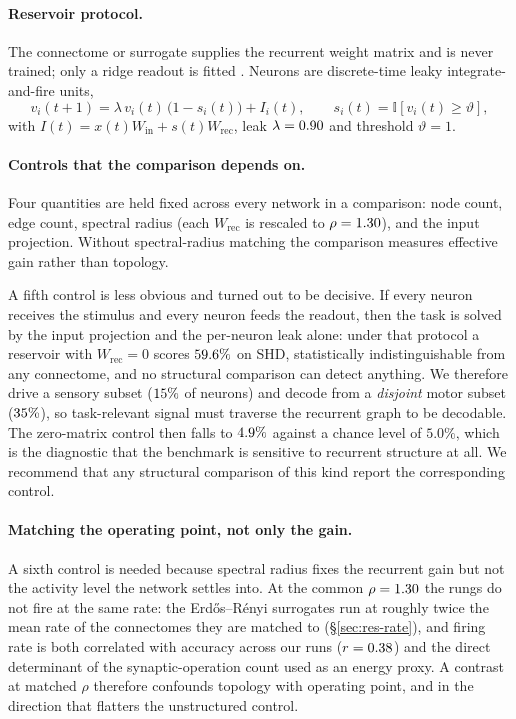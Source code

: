 \paragraph{Reservoir protocol.}
The connectome or surrogate supplies the recurrent weight matrix and is never
trained; only a ridge readout is fitted \cite{lukosevicius2009reservoir,
suarez2024connectome}. Neurons are discrete-time leaky integrate-and-fire units,
\begin{equation}
v_i(t{+}1) = \lambda\, v_i(t)\,\big(1 - s_i(t)\big) + I_i(t),
\qquad
s_i(t) = \mathbb{I}\!\left[v_i(t) \ge \vartheta\right],
\end{equation}
with $I(t) = x(t) W_{\mathrm{in}} + s(t) W_{\mathrm{rec}}$, leak $\lambda =
0.90$ and threshold $\vartheta = 1$.

\paragraph{Controls that the comparison depends on.}
Four quantities are held fixed across every network in a comparison: node count, edge
count, spectral radius (each $W_{\mathrm{rec}}$ is rescaled to $\rho =
1.30$), and the input projection. Without spectral-radius matching the
comparison measures effective gain rather than topology.

A fifth control is less obvious and turned out to be decisive. If every neuron
receives the stimulus and every neuron feeds the readout, then the task is solved by
the input projection and the per-neuron leak alone: under that protocol a reservoir
with $W_{\mathrm{rec}} = 0$ scores $59.6\%$ on SHD, statistically
indistinguishable from any connectome, and no structural comparison can detect
anything. We therefore drive a sensory subset ($15\%$ of neurons) and decode
from a \emph{disjoint} motor subset ($35\%$), so task-relevant signal must
traverse the recurrent graph to be decodable. The zero-matrix control then falls to
$4.9\%$ against a chance level of $5.0\%$, which is the diagnostic that the
benchmark is sensitive to recurrent structure at all. We recommend that any
structural comparison of this kind report the corresponding control.

\paragraph{Matching the operating point, not only the gain.}
A sixth control is needed because spectral radius fixes the recurrent gain but not the
activity level the network settles into. At the common $\rho = 1.30$ the
rungs do not fire at the same rate: the Erd\H{o}s--R\'enyi surrogates run at roughly
twice the mean rate of the connectomes they are matched to (\S\ref{sec:res-rate}), and
firing rate is both correlated with accuracy across our runs ($r = 0.38$) and
the direct determinant of the synaptic-operation count used as an energy proxy. A
contrast at matched $\rho$ therefore confounds topology with operating point, and in
the direction that flatters the unstructured control.

